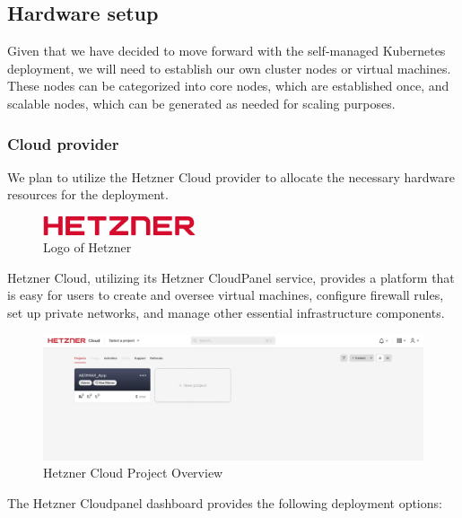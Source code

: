 \subsection{Hardware setup}
Given that we have decided to move forward with the self-managed Kubernetes deployment, we will need to establish our own cluster nodes or virtual machines. These nodes can be categorized into core nodes, which are established once, and scalable nodes, which can be generated as needed for scaling purposes.
\subsubsection{Cloud provider}
We plan to utilize the Hetzner Cloud provider to allocate the necessary hardware resources for the deployment.

\begin{figure}[H]
  \centering
  \includegraphics[width=0.4\textwidth]{src/assets/chapters/hetzner.png}
  \caption{Logo of Hetzner}
  \label{fig:cloud-provider}
\end{figure}



Hetzner Cloud, utilizing its Hetzner CloudPanel service, provides a platform that is easy for users to create and oversee virtual machines, configure firewall rules, set up private networks, and manage other essential infrastructure components.

\begin{figure}[H]
  \centering
  \includegraphics[width=1\textwidth]{src/assets/chapters/cloudproject.png}
  \caption{Hetzner Cloud Project Overview}
  \label{fig:cloud-project-overview}
\end{figure}

The Hetzner Cloudpanel dashboard provides the following deployment options:

